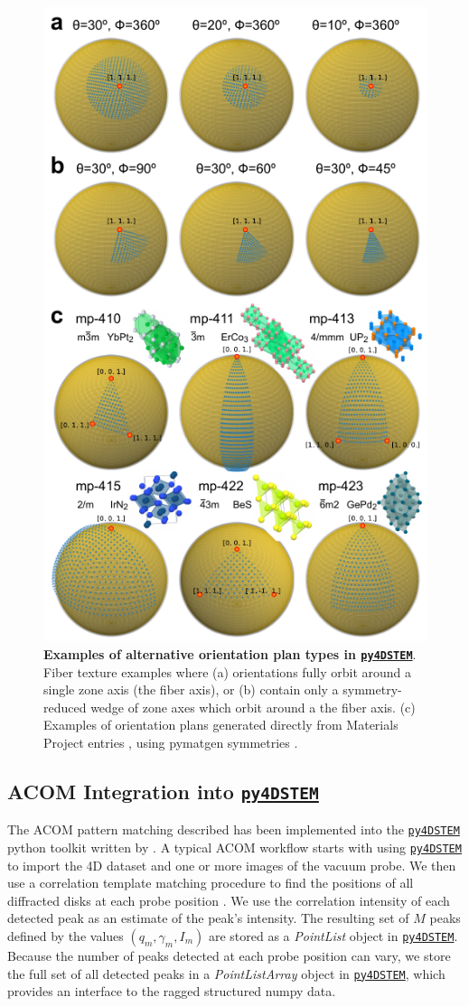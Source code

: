 \documentclass[%
 superscriptaddress,
 aip,
 amsmath,amssymb,
reprint,%
 author-year,%
longbibliography
]{revtex4-2}
\newcommand{\pyFDSTEM}{\href{https://github.com/py4dstem/py4DSTEM}{\texttt{py4DSTEM}}}
\begin{document}
\begin{figure}[htbp]
    \centering
    \includegraphics[width=3.2
    in]{figure_orientation_plans_v04.pdf}
    \caption{{\bf Examples of alternative orientation plan types in \pyFDSTEM{}}. Fiber texture examples where (a) orientations fully orbit around a single zone axis (the fiber axis), or (b) contain only a symmetry-reduced wedge of zone axes which orbit around a the fiber axis. (c) Examples of orientation plans generated directly from Materials Project entries \citep{jain2013commentary}, using pymatgen symmetries \citep{ong2013python}.}
    \label{Fig:ACOM_plans}
\end{figure}

\subsection*{ACOM Integration into \pyFDSTEM{}}




The ACOM pattern matching described has been implemented into the \pyFDSTEM{} python toolkit written by \cite{savitzky2021py4dstem}. A typical ACOM workflow starts with using \pyFDSTEM{} to import the 4D dataset and one or more images of the vacuum probe. We then use a correlation template matching procedure to find the positions of all diffracted disks at each probe position \citep{pekin2017optimizing}. We use the correlation intensity of each detected peak as an estimate of the peak's intensity. The resulting set of $M$ peaks defined by the values $(q_m, \gamma_m, I_m)$ are stored as a \emph{PointList} object in \pyFDSTEM{}. Because the number of peaks detected at each probe position can vary, we store the full set of all detected peaks in a \emph{PointListArray} object in \pyFDSTEM{}, which provides an interface to the ragged structured numpy data.
\end{document}
